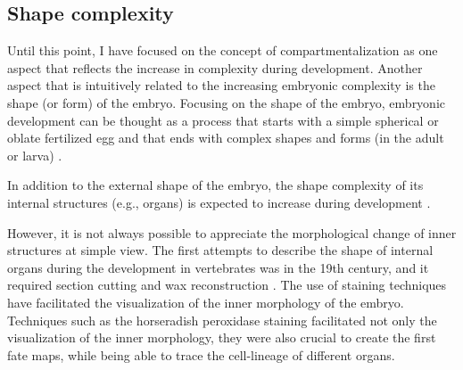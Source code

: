 %

\subsection{Shape complexity}

Until this point, I have focused on the concept of compartmentalization 
as one aspect that reflects the increase in complexity during development.
Another aspect that is intuitively related to the increasing embryonic complexity is the shape (or form) of the embryo. 
Focusing on the shape of the embryo, embryonic development can be thought as a process that starts with a simple spherical or oblate fertilized egg and that ends with complex shapes and forms (in the adult or larva) \citep{Forgacs_Newman2005}. 

In addition to the external shape of the embryo, the shape complexity of its internal structures (e.g., organs) is expected to increase during development \citep{Sharpe2003}. %

However, it is not always possible to appreciate the morphological change of inner structures at simple view. The first attempts to describe the shape of internal organs during the development in vertebrates was in the 19th century, and it required  section cutting and wax reconstruction \citep{Hopwood2007}. The use of staining techniques have facilitated the visualization of the inner morphology of the embryo. Techniques such as the horseradish peroxidase staining facilitated not only the visualization of the inner morphology, they were also crucial to create the first fate maps, while being able to trace the cell-lineage of different organs. 

